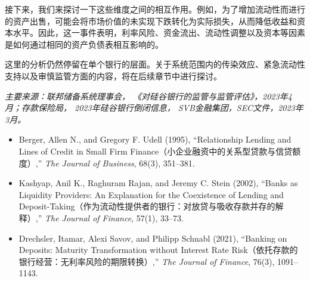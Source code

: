 接下来，我们来探讨一下这些维度之间的相互作用。例如，为了增加流动性而进行的资产出售，可能会将市场价值的未实现下跌转化为实际损失，从而降低收益和资本水平。因此，这一事件表明，利率风险、资金流出、流动性调整以及资本等因素是如何通过相同的资产负债表相互影响的。

这里的分析仍然停留在单个银行的层面。关于系统范围内的传染效应、紧急流动性支持以及审慎监管方面的内容，将在后续章节中进行探讨。

\emph{主要来源：联邦储备系统理事会，  
《对硅谷银行的监管与监管评估》，2023年4月；存款保险局，  
2023年硅谷银行倒闭信息，  
SVB金融集团，SEC文件，2023年3月。}



\begin{itemize}

\item Berger, Allen N., and Gregory F. Udell (1995),
``Relationship Lending and Lines of Credit in Small Firm Finance（小企业融资中的关系型贷款与信贷额度）,''
\emph{The Journal of Business}, 68(3), 351--381.

\item Kashyap, Anil K., Raghuram Rajan, and Jeremy C. Stein (2002),
``Banks as Liquidity Providers: An Explanation for the Coexistence of Lending and Deposit-Taking（作为流动性提供者的银行：对放贷与吸收存款并存的解释）,''
\emph{The Journal of Finance}, 57(1), 33--73.

\item Drechsler, Itamar, Alexi Savov, and Philipp Schnabl (2021),
``Banking on Deposits: Maturity Transformation without Interest Rate Risk（依托存款的银行经营：无利率风险的期限转换）,''
\emph{The Journal of Finance}, 76(3), 1091--1143.

\end{itemize}

